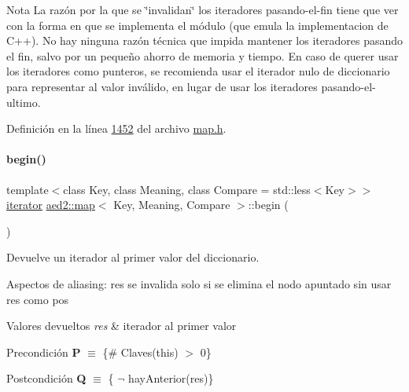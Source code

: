 \begin{DoxyNote}{Nota}
La razón por la que se \char`\"{}invalidan\char`\"{} los iteradores pasando-\/el-\/fin tiene que ver con la forma en que se implementa el módulo (que emula la implementacion de C++). No hay ninguna razón técnica que impida mantener los iteradores pasando el fin, salvo por un pequeño ahorro de memoria y tiempo. En caso de querer usar los iteradores como punteros, se recomienda usar el iterador nulo de diccionario para representar al valor inválido, en lugar de usar los iteradores pasando-\/el-\/ultimo. 
\end{DoxyNote}


Definición en la línea \hyperlink{map_8h_source_l01452}{1452} del archivo \hyperlink{map_8h_source}{map.\+h}.

\mbox{\label{classaed2_1_1map_a58a95705d54b3dda7f775ce5a22225cb_a58a95705d54b3dda7f775ce5a22225cb}} 
\paragraph{\texorpdfstring{begin()}{begin()}\hspace{0.1cm}{\footnotesize\ttfamily [1/2]}}
{\footnotesize\ttfamily template$<$class Key, class Meaning, class Compare = std\+::less$<$\+Key$>$$>$ \\
\hyperlink{classaed2_1_1map_1_1iterator}{iterator} \hyperlink{classaed2_1_1map}{aed2\+::map}$<$ Key, Meaning, Compare $>$\+::begin (\begin{DoxyParamCaption}{ }\end{DoxyParamCaption})\hspace{0.3cm}{\ttfamily [inline]}}



Devuelve un iterador al primer valor del diccionario. 

\begin{DoxyParagraph}{Aspectos de aliasing\+:}
res se invalida solo si se elimina el nodo apuntado sin usar res como pos
\end{DoxyParagraph}

\begin{DoxyRetVals}{Valores devueltos}
{\em res} & iterador al primer valor\\
\hline
\end{DoxyRetVals}
\begin{DoxyPrecond}{Precondición}
{\bfseries P} $\equiv$ \{\# Claves(this) $>$ 0\} 
\end{DoxyPrecond}
\begin{DoxyPostcond}{Postcondición}
{\bfseries Q} $\equiv$ \{ $\lnot$ hay\+Anterior(res)\}
\end{DoxyPostcond}

